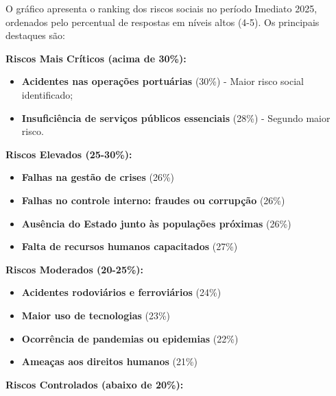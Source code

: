 \documentclass[
  portuguese,
  letterpaper,
  DIV=11,
  numbers=noendperiod]{scrreprt}
\providecommand{\tightlist}{%
  \setlength{\itemsep}{0pt}\setlength{\parskip}{0pt}}
\begin{document}
\begin{tcolorbox}[enhanced jigsaw, breakable, leftrule=.75mm, opacitybacktitle=0.6, coltitle=black, rightrule=.15mm, colbacktitle=quarto-callout-note-color!10!white, colframe=quarto-callout-note-color-frame, titlerule=0mm, bottomtitle=1mm, colback=white, toprule=.15mm, toptitle=1mm, left=2mm, title=\textcolor{quarto-callout-note-color}{\faInfo}\hspace{0.5em}{Destaque}, opacityback=0, bottomrule=.15mm, arc=.35mm]

O gráfico apresenta o ranking dos riscos sociais no período Imediato
2025, ordenados pelo percentual de respostas em níveis altos (4-5). Os
principais destaques são:

\textbf{Riscos Mais Críticos (acima de 30\%):}

\begin{itemize}
\tightlist
\item
  \textbf{Acidentes nas operações portuárias} (30\%) - Maior risco
  social identificado;
\item
  \textbf{Insuficiência de serviços públicos essenciais} (28\%) -
  Segundo maior risco.
\end{itemize}

\textbf{Riscos Elevados (25-30\%):}

\begin{itemize}
\item
  \textbf{Falhas na gestão de crises} (26\%)
\item
  \textbf{Falhas no controle interno: fraudes ou corrupção} (26\%)
\item
  \textbf{Ausência do Estado junto às populações próximas} (26\%)
\item
  \textbf{Falta de recursos humanos capacitados} (27\%)
\end{itemize}

\textbf{Riscos Moderados (20-25\%):}

\begin{itemize}
\item
  \textbf{Acidentes rodoviários e ferroviários} (24\%)
\item
  \textbf{Maior uso de tecnologias} (23\%)
\item
  \textbf{Ocorrência de pandemias ou epidemias} (22\%)
\item
  \textbf{Ameaças aos direitos humanos} (21\%)
\end{itemize}

\textbf{Riscos Controlados (abaixo de 20\%):}


\end{tcolorbox}
\end{document}
